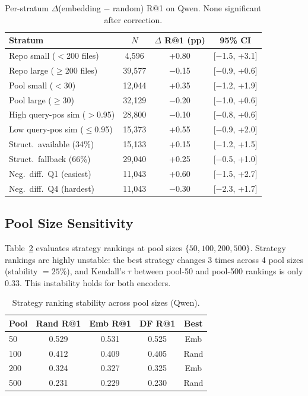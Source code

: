 \documentclass[11pt,a4paper]{article}
\begin{document}
\begin{table}[t]
\centering
\caption{Per-stratum $\Delta$(embedding $-$ random) R@1 on Qwen. None significant after correction.}
\label{tab:stratified}
\small
\begin{tabular}{lccc}
\toprule
\textbf{Stratum} & \textbf{$N$} & \textbf{$\Delta$ R@1 (pp)} & \textbf{95\% CI} \\
\midrule
Repo small ($<$200 files) & 4,596 & +0.80 & [$-$1.5, +3.1] \\
Repo large ($\geq$200 files) & 39,577 & $-$0.15 & [$-$0.9, +0.6] \\
Pool small ($<$30) & 12,044 & +0.35 & [$-$1.2, +1.9] \\
Pool large ($\geq$30) & 32,129 & $-$0.20 & [$-$1.0, +0.6] \\
High query-pos sim ($>$0.95) & 28,800 & $-$0.10 & [$-$0.8, +0.6] \\
Low query-pos sim ($\leq$0.95) & 15,373 & +0.55 & [$-$0.9, +2.0] \\
Struct.\ available (34\%) & 15,133 & +0.15 & [$-$1.2, +1.5] \\
Struct.\ fallback (66\%) & 29,040 & +0.25 & [$-$0.5, +1.0] \\
Neg.\ diff.\ Q1 (easiest) & 11,043 & +0.60 & [$-$1.5, +2.7] \\
Neg.\ diff.\ Q4 (hardest) & 11,043 & $-$0.30 & [$-$2.3, +1.7] \\
\bottomrule
\end{tabular}
\end{table}

\subsection{Pool Size Sensitivity}
\label{sec:pool}

Table~\ref{tab:pool} evaluates strategy rankings at pool sizes $\{50, 100, 200, 500\}$.
Strategy rankings are highly unstable: the best strategy changes 3 times across 4 pool sizes (stability $= 25\%$), and Kendall's $\tau$ between pool-50 and pool-500 rankings is only 0.33.
This instability holds for both encoders.

\begin{table}[t]
\centering
\caption{Strategy ranking stability across pool sizes (Qwen).}
\label{tab:pool}
\small
\begin{tabular}{lcccc}
\toprule
\textbf{Pool} & \textbf{Rand R@1} & \textbf{Emb R@1} & \textbf{DF R@1} & \textbf{Best} \\
\midrule
50 & 0.529 & 0.531 & 0.525 & Emb \\
100 & 0.412 & 0.409 & 0.405 & Rand \\
200 & 0.324 & 0.327 & 0.325 & Emb \\
500 & 0.231 & 0.229 & 0.230 & Rand \\
\bottomrule
\end{tabular}
\end{table}
\end{document}
